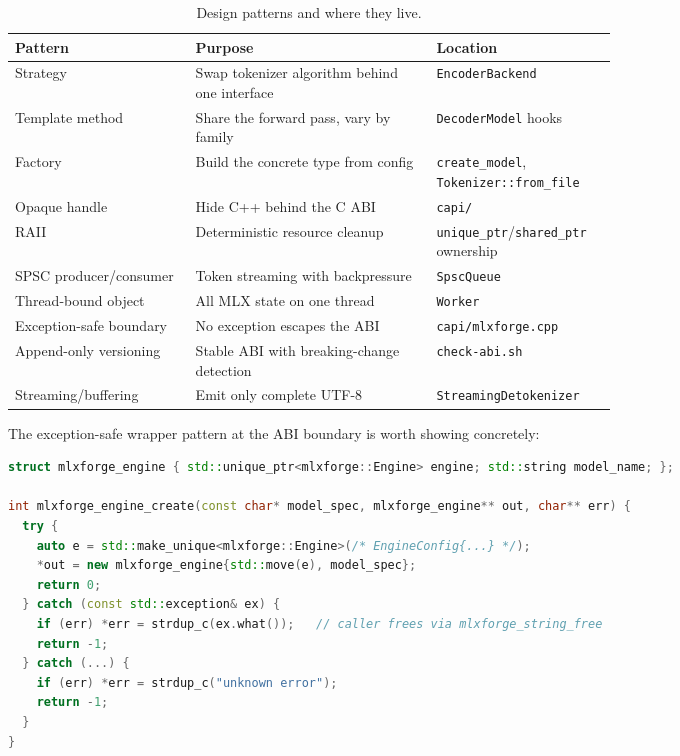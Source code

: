 \documentclass[11pt,a4paper]{report}
\newcommand{\code}[1]{\texttt{#1}}
\begin{document}
\begin{table}[h]
\centering
\caption{Design patterns and where they live.}
\label{tab:patterns}
\small
\begin{tabular}{@{}l p{0.40\linewidth} p{0.30\linewidth}@{}}
\toprule
Pattern & Purpose & Location \\
\midrule
Strategy            & Swap tokenizer algorithm behind one interface & \code{EncoderBackend} \\
Template method     & Share the forward pass, vary by family        & \code{DecoderModel} hooks \\
Factory             & Build the concrete type from config           & \code{create\_model}, \code{Tokenizer::from\_file} \\
Opaque handle       & Hide C++ behind the C ABI                     & \code{capi/} \\
RAII                & Deterministic resource cleanup                & \code{unique\_ptr}/\code{shared\_ptr} ownership \\
SPSC producer/consumer & Token streaming with backpressure          & \code{SpscQueue} \\
Thread-bound object & All MLX state on one thread                   & \code{Worker} \\
Exception-safe boundary & No exception escapes the ABI              & \code{capi/mlxforge.cpp} \\
Append-only versioning & Stable ABI with breaking-change detection  & \code{check-abi.sh} \\
Streaming/buffering & Emit only complete UTF-8                      & \code{StreamingDetokenizer} \\
\bottomrule
\end{tabular}
\end{table}

The exception-safe wrapper pattern at the ABI boundary is worth showing concretely:

\begin{lstlisting}[language=C++,caption={Every C-ABI entry point catches all exceptions and reports via the out-parameter.}]
struct mlxforge_engine { std::unique_ptr<mlxforge::Engine> engine; std::string model_name; };

int mlxforge_engine_create(const char* model_spec, mlxforge_engine** out, char** err) {
  try {
    auto e = std::make_unique<mlxforge::Engine>(/* EngineConfig{...} */);
    *out = new mlxforge_engine{std::move(e), model_spec};
    return 0;
  } catch (const std::exception& ex) {
    if (err) *err = strdup_c(ex.what());   // caller frees via mlxforge_string_free
    return -1;
  } catch (...) {
    if (err) *err = strdup_c("unknown error");
    return -1;
  }
}
\end{lstlisting}
\end{document}
